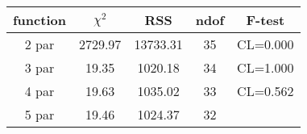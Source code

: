 \begin{tabular}{c|c|c|c|c}
function & $\chi^2$ & RSS & ndof & F-test \\
\hline
2 par & 2729.97 & 13733.31 & 35 & CL=0.000 \\
3 par & 19.35 & 1020.18 & 34 & CL=1.000 \\
4 par & 19.63 & 1035.02 & 33 & CL=0.562 \\
5 par & 19.46 & 1024.37 & 32 & \\
\hline
\end{tabular}